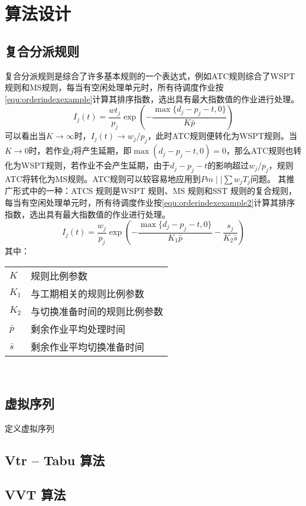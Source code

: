 \chapter{算法设计}
\section{复合分派规则}
复合分派规则是综合了许多基本规则的一个表达式，例如ATC规则综合了WSPT规则和MS规则，每当有空闲处理单元时，所有待调度作业按\eqref{equ:orderindexexample}计算其排序指数，选出具有最大指数值的作业进行处理。
\begin{equation}
I_j(t) = \frac{wt_j}{p_j}\exp\left(-\frac{\max\{d_j - p_j - t, 0\}}{K\bar p}\right) \label{equ:orderindexexample}
\end{equation}
可以看出当$K \to \infty$时，$I_j(t) \to w_j/p_j$，此时ATC规则便转化为WSPT规则。当$K \to 0$时，若作业$j$将产生延期，即$\max(d_j - p_j -t , 0 ) = 0$，那么ATC规则也转化为WSPT规则，若作业不会产生延期，由于$d_j - p_j - t$的影响超过$w_j/p_j$，规则ATC将转化为MS规则。ATC规则可以较容易地应用到$Pm\mid\mid \sum w_jT_j$问题。
其推广形式中的一种：ATCS 规则是WSPT 规则、MS 规则和SST 规则的复合规则，每当有空闲处理单元时，所有待调度作业按\eqref{equ:orderindexexample2}计算其排序指数，选出具有最大指数值的作业进行处理。
\begin{equation}
I_j(t) = \frac{w_j}{p_j}\exp\left(-\frac{\max\{d_j - p_j - t, 0\}}{K_1\bar p} - \frac{s_j}{K_2 \bar s}\right) \label{equ:orderindexexample2}
\end{equation}
其中：

\begin{tabular}{ll}
$K$ & 规则比例参数\\[5pt]
$K_1$ & 与工期相关的规则比例参数\\[5pt]
$K_2$ & 与切换准备时间的规则比例参数\\[5pt]
$\bar p$ &剩余作业平均处理时间\\[5pt]
$\bar s$ & 剩余作业平均切换准备时间
\end{tabular}\\
\section{虚拟序列}
定义虚拟序列
\section{Vtr -- Tabu 算法}

\section{VVT 算法}

